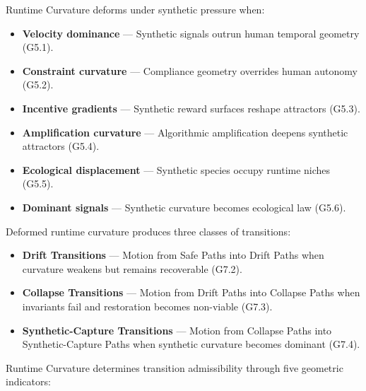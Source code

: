 \medskip

\noindent Runtime Curvature deforms under synthetic pressure when:

\begin{itemize}[leftmargin=1.2cm]
    \item \textbf{Velocity dominance} — Synthetic signals outrun human temporal
    geometry (G5.1).

    \item \textbf{Constraint curvature} — Compliance geometry overrides human
    autonomy (G5.2).

    \item \textbf{Incentive gradients} — Synthetic reward surfaces reshape
    attractors (G5.3).

    \item \textbf{Amplification curvature} — Algorithmic amplification deepens
    synthetic attractors (G5.4).

    \item \textbf{Ecological displacement} — Synthetic species occupy runtime
    niches (G5.5).

    \item \textbf{Dominant signals} — Synthetic curvature becomes ecological law
    (G5.6).
\end{itemize}

\medskip

\noindent Deformed runtime curvature produces three classes of transitions:

\begin{itemize}[leftmargin=1.2cm]
    \item \textbf{Drift Transitions} — Motion from Safe Paths into Drift Paths
    when curvature weakens but remains recoverable (G7.2).

    \item \textbf{Collapse Transitions} — Motion from Drift Paths into Collapse
    Paths when invariants fail and restoration becomes non-viable (G7.3).

    \item \textbf{Synthetic-Capture Transitions} — Motion from Collapse Paths
    into Synthetic-Capture Paths when synthetic curvature becomes dominant
    (G7.4).
\end{itemize}

\medskip

\noindent Runtime Curvature determines transition admissibility through five
geometric indicators:

